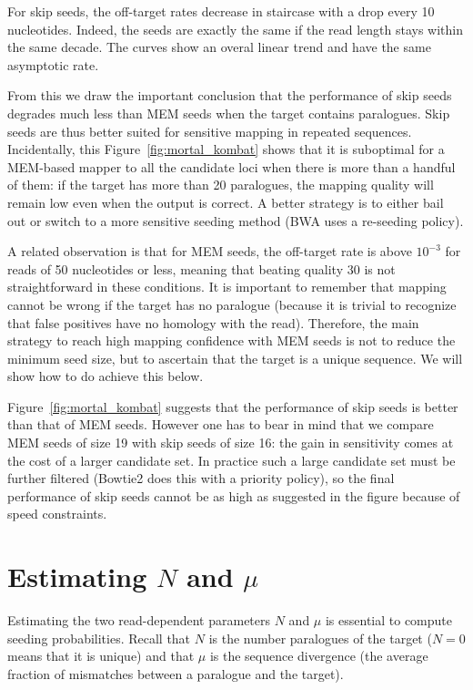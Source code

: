 \documentclass[a4,center,fleqn]{NAR}
\begin{document}
For skip seeds, the off-target rates decrease in staircase with a drop
every 10 nucleotides. Indeed, the seeds are exactly the same if the read
length stays within the same decade. The curves show an overal linear
trend and have the same asymptotic rate.

From this we draw the important conclusion that the performance of skip
seeds degrades much less than MEM seeds when the target contains
paralogues. Skip seeds are thus better suited for sensitive mapping in
repeated sequences. Incidentally, this Figure~\ref{fig:mortal_kombat}
shows that it is suboptimal for a MEM-based mapper to all the candidate
loci when there is more than a handful of them: if the target has more
than 20 paralogues, the mapping quality will remain low even when the
output is correct. A better strategy is to either bail out or switch to a
more sensitive seeding method (BWA uses a re-seeding policy).

A related observation is that for MEM seeds, the off-target rate is above
$10^{-3}$ for reads of 50 nucleotides or less, meaning that beating
quality 30 is not straightforward in these conditions. It is important to
remember that mapping cannot be wrong if the target has no paralogue
(because it is trivial to recognize that false positives have no homology
with the read). Therefore, the main strategy to reach high mapping
confidence with MEM seeds is not to reduce the minimum seed size, but to
ascertain that the target is a unique sequence. We will show how to do
achieve this below.

Figure~\ref{fig:mortal_kombat} suggests that the performance of skip seeds
is better than that of MEM seeds. However one has to bear in mind that we
compare MEM seeds of size 19 with skip seeds of size 16: the gain in
sensitivity comes at the cost of a larger candidate set. In practice such
a large candidate set must be further filtered (Bowtie2 does this with a
priority policy), so the final performance of skip seeds cannot be as high
as suggested in the figure because of speed constraints.


\section{Estimating $N$ and $\mu$}

Estimating the two read-dependent parameters $N$ and $\mu$ is essential to
compute seeding probabilities. Recall that $N$ is the number paralogues of
the target ($N=0$ means that it is unique) and that $\mu$ is the sequence
divergence (the average fraction of mismatches between a paralogue and the
target).
\end{document}
